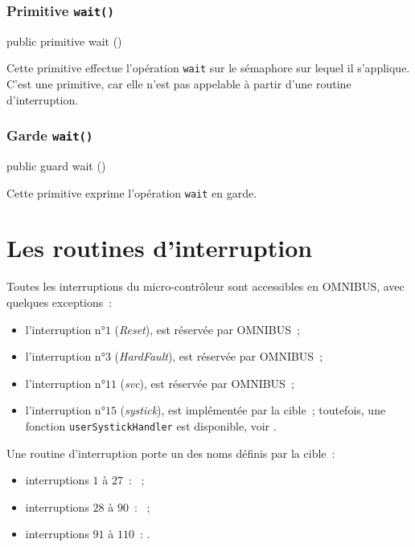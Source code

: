\subsubsection{Primitive \texttt{wait()}}

\begin{OMNIBUS}
  public primitive wait ()
\end{OMNIBUS}

Cette primitive effectue l'opération \texttt{wait} sur le sémaphore sur lequel il s'applique. C'est une primitive, car elle n'est pas appelable à partir d'une routine d'interruption.





\subsubsection{Garde \texttt{wait()}}

\begin{OMNIBUS}
  public guard wait ()
\end{OMNIBUS}

Cette primitive exprime l'opération \texttt{wait} en garde.












\section{Les routines d'interruption}

Toutes les interruptions du micro-contrôleur sont accessibles en OMNIBUS, avec quelques exceptions~:
\begin{itemize}
  \item l'interruption n°$1$ (\emph{Reset}), est réservée par OMNIBUS~;
  \item l'interruption n°$3$ (\emph{HardFault}), est réservée par OMNIBUS~;
  \item l'interruption n°$11$ (\emph{svc}), est réservée par OMNIBUS~;
  \item l'interruption n°$15$ (\emph{systick}), est implémentée par la cible~; toutefois, une fonction \texttt{userSystickHandler} est disponible, voir .
\end{itemize}

Une routine d'interruption porte un des noms définis par la cible~:
\begin{itemize}
  \item interruptions $1$ à $27$~: ~;
  \item interruptions $28$ à $90$~: ~;
  \item interruptions $91$ à $110$~: .
\end{itemize}




